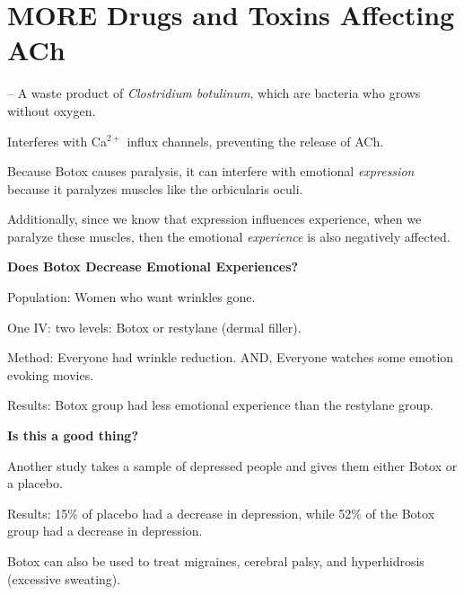 \section{MORE Drugs and Toxins Affecting ACh}

\begin{coloredlist}
    \item {} -- A waste product of \textit{Clostridium botulinum}, which are bacteria who grows without oxygen. 
    \begin{coloredlist}
        \item Interferes with Ca\(^{2+}\) influx channels, preventing the release of ACh.
        \item Because Botox causes paralysis, it can interfere with emotional \textit{expression} because it paralyzes muscles like the orbicularis oculi.
        \item Additionally, since we know that expression influences experience, when we paralyze these muscles, then the emotional \textit{experience} is also negatively affected.
        \item \textbf{Does Botox Decrease Emotional Experiences?}
        \begin{coloredlist}
            \item Population: Women who want wrinkles gone.
            \item One IV: two levels: Botox or restylane (dermal filler).
            \item Method: Everyone had wrinkle reduction. AND, Everyone watches some emotion evoking movies.
            \item Results: Botox group had less emotional experience than the restylane group.
            \item \textbf{Is this a good thing?}
            \begin{coloredlist}
                \item Another study takes a sample of depressed people and gives them either Botox or a placebo.
                \item Results: 15\% of placebo had a decrease in depression, while 52\% of the Botox group had a decrease in depression.
            \end{coloredlist}
        \end{coloredlist}
        \item Botox can also be used to treat migraines, cerebral palsy, and hyperhidrosis (excessive sweating).
    \end{coloredlist}

\end{coloredlist}
